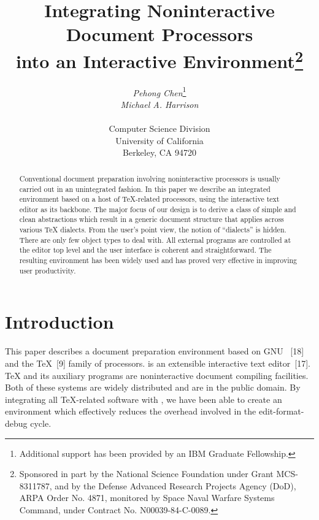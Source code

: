 


\title{Integrating Noninteractive Document Processors\\
into an Interactive Environment\thanks{Sponsored
in part by the National Science Foundation under Grant MCS-8311787,
and by the Defense Advanced Research Projects Agency (DoD),
ARPA Order No. 4871, monitored by Space Naval Warfare Systems Command,
under Contract No. N00039-84-C-0089.}
}

\author{{\sl Pehong Chen}\thanks{Additional support has been provided
by an IBM Graduate Fellowship.}\\
	{\sl Michael A. Harrison}\\\\
	Computer Science Division \\
	University of California \\
	Berkeley, CA 94720
}
\maketitle

\begin{abstract}
Conventional document preparation involving noninteractive processors
is usually carried out in an unintegrated fashion.
In this paper we describe an integrated environment based on a host of
{\TeX}-related processors, using
the interactive text editor {\emacs} as its backbone.
The major focus of our design is to derive a class of simple and clean
abstractions which result in a generic document
structure that applies across various {\TeX} dialects.
From the user's point view, the notion of ``dialects'' is hidden.
There are only few object types to deal with.
All external programs are controlled at the editor top level
and the user interface is coherent and straightforward.
The resulting environment has been widely used and has proved very
effective in improving user productivity.
\end{abstract}


\section{Introduction}
This paper describes a document preparation environment based
on GNU {\emacs}~[18] and the {\TeX}~[9] family of
processors.
{\emacs} is an extensible interactive text editor~[17].
{\TeX} and its auxiliary programs are noninteractive document compiling
facilities.
Both of these systems are widely distributed and are in the public domain.
By integrating all {\TeX}-related software with {\emacs}, we have been able to
create an environment which effectively reduces the overhead
involved in the edit-format-debug cycle.

